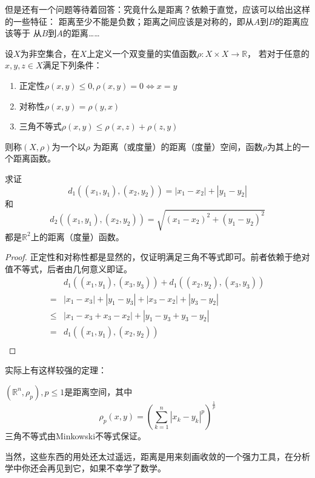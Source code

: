 但是还有一个问题等待着回答：究竟什么是距离？依赖于直觉，应该可以给出这样的一些特征：
距离至少不能是负数；距离之间应该是对称的，即从\(A\)到\(B\)的距离应该等于
从\(B\)到\(A\)的距离……
\begin{definition}[距离空间]
    设$X$为非空集合，在$X$上定义一个双变量的实值函数\(\rho:X\times X\rightarrow\mathbb{R}\)，
    若对于任意的\(x,y,z\in X\)满足下列条件：
    \begin{enumerate}[(1)]
        \setlength{\itemsep}{-\itemsep}
        \item 正定性\(\rho(x,y)\leq 0,\rho(x,y)=0\Leftrightarrow x=y\)
        \item 对称性\(\rho(x,y)=\rho(y,x)\)
        \item 三角不等式\(\rho(x,y)\leq \rho(x,z)+\rho(z,y)\)
    \end{enumerate}
    则称\((X,\rho)\)为一个以\(\rho\) 为距离（或度量）的距离（度量）空间，函数\(\rho\)为其上的一个距离函数。
\end{definition}
\begin{example}求证
  \[ d_1((x_1,y_1),(x_2,y_2))=|x_1-x_2|+|y_1-y_2|\]和
    \[d_2((x_1,y_1),(x_2,y_2))=\sqrt{(x_1-x_2)^2+(y_1-y_2)^2}\]都是\(\mathbb{R}^2\)上的距离（度量）函数。
\end{example}
\begin{proof}
    正定性和对称性都是显然的，仅证明满足三角不等式即可。前者依赖于绝对值不等式，后者由几何意义即证。
    \begin{align*}
        &d_1((x_1,y_1),(x_3,y_3))+ d_1((x_2,y_2),(x_3,y_3))\\
        =&|x_1-x_3|+|y_1-y_3|+|x_3-x_2|+|y_3-y_2|\\
        \leq&|x_1-x_3+x_3-x_2|+|y_1-y_3+y_3-y_2|\\
        =&d_1((x_1,y_1),(x_2,y_2))\\
    \end{align*}
\end{proof}
实际上有这样较强的定理：
\begin{theorem}
    \((\mathbb{R}^n,\rho_p),p\leq 1\)是距离空间，其中
    \[\rho_p(x,y)=\left(\sum_{k=1}^{n}|x_k-y_k|^p\right)^{\frac{1}{p}}\]
    三角不等式由Minkowski不等式保证。
\end{theorem}

当然，这些东西的用处还太过遥远，距离是用来刻画收敛的一个强力工具，在分析学中你还会再见到它，如果不幸学了数学。

\clearpage








